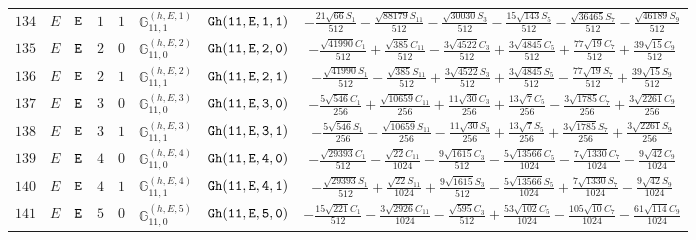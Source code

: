 \documentclass[fleqn,8pt]{jsarticle}
\begin{document}
\begin{table}[ht!]
\begin{center}
\begin{tabular}{cccccccc}
$ 134 $ & $ E $ & $ {\tt E} $ & $ 1 $ & $ 1 $ & $ \mathbb{G}_{11,1}^{(h,E,1)} $ & $ {\tt Gh(11,E,1,1)} $ & $ - \frac{21 \sqrt{66} S_{1}}{512} - \frac{\sqrt{88179} S_{11}}{512} - \frac{\sqrt{30030} S_{3}}{512} - \frac{15 \sqrt{143} S_{5}}{512} - \frac{\sqrt{36465} S_{7}}{512} - \frac{\sqrt{46189} S_{9}}{512} $ \\
$ 135 $ & $ E $ & $ {\tt E} $ & $ 2 $ & $ 0 $ & $ \mathbb{G}_{11,0}^{(h,E,2)} $ & $ {\tt Gh(11,E,2,0)} $ & $ - \frac{\sqrt{41990} C_{1}}{512} + \frac{\sqrt{385} C_{11}}{512} - \frac{3 \sqrt{4522} C_{3}}{512} + \frac{3 \sqrt{4845} C_{5}}{512} + \frac{77 \sqrt{19} C_{7}}{512} + \frac{39 \sqrt{15} C_{9}}{512} $ \\
$ 136 $ & $ E $ & $ {\tt E} $ & $ 2 $ & $ 1 $ & $ \mathbb{G}_{11,1}^{(h,E,2)} $ & $ {\tt Gh(11,E,2,1)} $ & $ - \frac{\sqrt{41990} S_{1}}{512} - \frac{\sqrt{385} S_{11}}{512} + \frac{3 \sqrt{4522} S_{3}}{512} + \frac{3 \sqrt{4845} S_{5}}{512} - \frac{77 \sqrt{19} S_{7}}{512} + \frac{39 \sqrt{15} S_{9}}{512} $ \\
$ 137 $ & $ E $ & $ {\tt E} $ & $ 3 $ & $ 0 $ & $ \mathbb{G}_{11,0}^{(h,E,3)} $ & $ {\tt Gh(11,E,3,0)} $ & $ - \frac{5 \sqrt{546} C_{1}}{256} + \frac{\sqrt{10659} C_{11}}{256} + \frac{11 \sqrt{30} C_{3}}{256} + \frac{13 \sqrt{7} C_{5}}{256} - \frac{3 \sqrt{1785} C_{7}}{256} + \frac{3 \sqrt{2261} C_{9}}{256} $ \\
$ 138 $ & $ E $ & $ {\tt E} $ & $ 3 $ & $ 1 $ & $ \mathbb{G}_{11,1}^{(h,E,3)} $ & $ {\tt Gh(11,E,3,1)} $ & $ - \frac{5 \sqrt{546} S_{1}}{256} - \frac{\sqrt{10659} S_{11}}{256} - \frac{11 \sqrt{30} S_{3}}{256} + \frac{13 \sqrt{7} S_{5}}{256} + \frac{3 \sqrt{1785} S_{7}}{256} + \frac{3 \sqrt{2261} S_{9}}{256} $ \\
$ 139 $ & $ E $ & $ {\tt E} $ & $ 4 $ & $ 0 $ & $ \mathbb{G}_{11,0}^{(h,E,4)} $ & $ {\tt Gh(11,E,4,0)} $ & $ - \frac{\sqrt{29393} C_{1}}{512} - \frac{\sqrt{22} C_{11}}{1024} - \frac{9 \sqrt{1615} C_{3}}{512} - \frac{5 \sqrt{13566} C_{5}}{1024} - \frac{7 \sqrt{1330} C_{7}}{1024} - \frac{9 \sqrt{42} C_{9}}{1024} $ \\
$ 140 $ & $ E $ & $ {\tt E} $ & $ 4 $ & $ 1 $ & $ \mathbb{G}_{11,1}^{(h,E,4)} $ & $ {\tt Gh(11,E,4,1)} $ & $ - \frac{\sqrt{29393} S_{1}}{512} + \frac{\sqrt{22} S_{11}}{1024} + \frac{9 \sqrt{1615} S_{3}}{512} - \frac{5 \sqrt{13566} S_{5}}{1024} + \frac{7 \sqrt{1330} S_{7}}{1024} - \frac{9 \sqrt{42} S_{9}}{1024} $ \\
$ 141 $ & $ E $ & $ {\tt E} $ & $ 5 $ & $ 0 $ & $ \mathbb{G}_{11,0}^{(h,E,5)} $ & $ {\tt Gh(11,E,5,0)} $ & $ - \frac{15 \sqrt{221} C_{1}}{512} - \frac{3 \sqrt{2926} C_{11}}{1024} - \frac{\sqrt{595} C_{3}}{512} + \frac{53 \sqrt{102} C_{5}}{1024} - \frac{105 \sqrt{10} C_{7}}{1024} - \frac{61 \sqrt{114} C_{9}}{1024} $ \\

\end{tabular}
\end{center}
\end{table}
\end{document}
